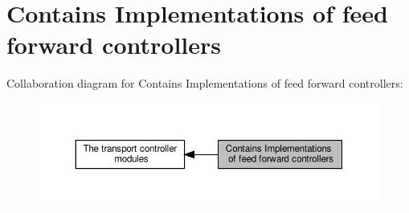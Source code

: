 \hypertarget{group__group__feed__froward}{}\section{Contains Implementations of feed forward controllers}
\label{group__group__feed__froward}
Collaboration diagram for Contains Implementations of feed forward controllers\+:\nopagebreak
\begin{figure}[H]
\begin{center}
\leavevmode
\includegraphics[width=350pt]{d9/d5c/group__group__feed__froward}
\end{center}
\end{figure}
